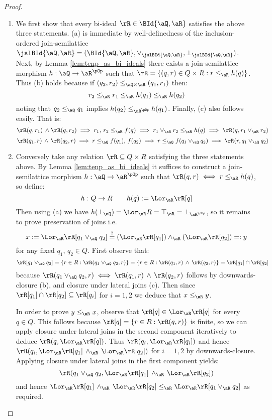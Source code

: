\documentclass{article}
\begin{document}
\begin{proof}
\item
\begin{enumerate}
\item
We first show that every bi-ideal $\rR \in \BId{\aQ,\aR}$ satisfies the above three statements. (a) is immediate by well-definedness of the inclusion-ordered join-semilattice $\jslBId{\aQ,\aR} = (\BId{\aQ,\aR},\lor_{\jslBId{\aQ,\aR}},\bot_{\jslBId{\aQ,\aR}})$. Next, by Lemma \ref{lem:tenp_as_bi_ideals} there exists a join-semilattice morphism $h : \aQ \to \aR^{\pOp}$ such that $\rR = \{ (q,r) \in Q \times R : r \leq_\aR h(q) \}$. Thus (b) holds because if $(q_2,r_2) \leq_{\aQ \times \aR} (q_1,r_1)$ then:
\[
r_2 \leq_\aR r_1 \leq_\aR h(q_1) \leq_\aR h(q_2)
\]
noting that $q_2 \leq_\aQ q_1$ implies $h(q_2) \leq_{\aR^{\pOp}} h(q_1)$. Finally, (c) also follows easily. That is:
\[
\rR(q,r_1)\,\land\rR(q,r_2)
\implies
r_1,\,r_2 \leq_\aR f(q)
\implies
r_1 \lor_\aR r_2 \leq_\aR h(q)
\implies
\rR(q,r_1 \lor_\aR r_2)
\]
\[
\rR(q_1,r)\,\land\,\rR(q_2,r)
\implies
r \leq_\aQ f(q_1),\,f(q_2)
\implies
r \leq_\aQ f(q_1 \lor_\aQ q_2)
\implies
\rR(r,q_1 \lor_\aQ q_2) 
\]


\item
Conversely take any relation $\rR \subseteq Q \times R$ satisfying the three statements above. By Lemma \ref{lem:tenp_as_bi_ideals} it suffices to construct a join-semilattice morphism $h : \aQ \to \aR^{\pOp}$ such that $\rR(q,r) \iff r \leq_\aR h(q)$, so define:
\[
h : Q \to R
\qquad
h(q) := \Lor_\aR \rR[q]
\]
Then using (a) we have $h(\bot_\aQ) = \Lor_\aR R = \top_\aR = \bot_{\aR^{\pOp}}$, so it remains to prove preservation of joins i.e.\
\[
x := \Lor_\aR \rR[q_1 \lor_\aQ q_2] \stackrel{?}{=} (\Lor_\aR \rR[q_1]) \land_\aR (\Lor_\aR \rR[q_2]) =: y
\]
for any fixed $q_1$, $q_2 \in Q$. First observe that:
\[
\rR[q_1 \lor_\aQ q_2] 
= \{ r \in R : \rR(q_1 \lor_\aQ q_2, r) \}
= \{ r \in R : \rR(q_1,r) \,\land\,\rR(q_2,r) \}
= \rR[q_1] \cap \rR[q_2]
\]
because $\rR(q_1 \lor_\aQ q_2,r) \iff  \rR(q_1,r) \,\land\,\rR(q_2,r)$ follows by downwards-closure (b), and closure under lateral joins (c). Then since $\rR[q_1] \cap \rR[q_2] \subseteq \rR[q_i]$ for $i = 1,2$ we deduce that $x \leq_\aR y$.

\smallskip
In order to prove $y \leq_\aR x$, observe that $\rR[q] \in \Lor_\aR \rR[q]$ for every $q \in Q$. This follows because $\rR[q] = \{ r \in R : \rR(q,r) \}$ is finite, so we can apply closure under lateral joins in the second component iteratively to deduce $\rR(q,\Lor_\aR \rR[q])$. Thus $\rR(q_i,\Lor_\aR \rR[q_i])$ and hence $\rR(q_i,\Lor_\aR \rR[q_1] \, \land_\aR \, \Lor_\aR \rR[q_2])$ for $i = 1,2$ by downwards-closure. Applying closure under lateral joins in the first component yields:
\[
\rR(q_1 \lor_\aQ q_2,\Lor_\aR \rR[q_1] \, \land_\aR \, \Lor_\aR \rR[q_2])
\]
and hence $\Lor_\aR \rR[q_1] \, \land_\aR \, \Lor_\aR \rR[q_2] \leq_\aR \Lor_\aR \rR[q_1 \lor_\aR q_2]$ as required.
\end{enumerate}
\end{proof}
\end{document}
